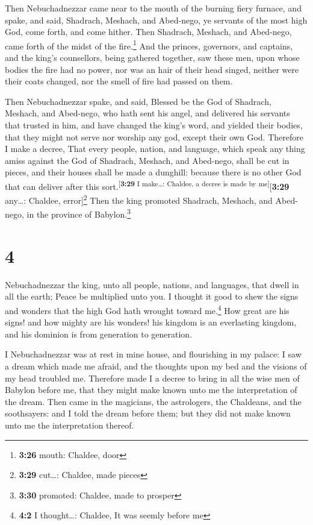  Then Nebuchadnezzar came near to the mouth of the
burning fiery furnace, and spake, and said, Shadrach, Meshach, and
Abed-nego, ye servants of the most high God, come forth, and come
hither. Then Shadrach, Meshach, and Abed-nego, came forth of the midst
of the fire.\footnote{\textbf{3:26} mouth: Chaldee, door}
 And the princes, governors, and captains, and the king's
counsellors, being gathered together, saw these men, upon whose bodies
the fire had no power, nor was an hair of their head singed, neither
were their coats changed, nor the smell of fire had passed on them.

 Then Nebuchadnezzar spake, and said, Blessed be the God
of Shadrach, Meshach, and Abed-nego, who hath sent his angel, and
delivered his servants that trusted in him, and have changed the king's
word, and yielded their bodies, that they might not serve nor worship
any god, except their own God.  Therefore I make a
decree, That every people, nation, and language, which speak any thing
amiss against the God of Shadrach, Meshach, and Abed-nego, shall be cut
in pieces, and their houses shall be made a dunghill: because there is
no other God that can deliver after this
sort.\textsuperscript{{[}\textbf{3:29} I make\ldots: Chaldee, a decree
is made by me{]}}{[}\textbf{3:29} any\ldots: Chaldee,
error{]}\footnote{\textbf{3:29} cut\ldots: Chaldee, made pieces}
 Then the king promoted Shadrach, Meshach, and Abed-nego,
in the province of Babylon.\footnote{\textbf{3:30} promoted: Chaldee,
  made to prosper}

\hypertarget{section-3}{%
\section{4}\label{section-3}}

 Nebuchadnezzar the king, unto all people, nations, and
languages, that dwell in all the earth; Peace be multiplied unto you.
 I thought it good to shew the signs and wonders that the
high God hath wrought toward me.\footnote{\textbf{4:2} I thought\ldots:
  Chaldee, It was seemly before me}  How great are his
signs! and how mighty are his wonders! his kingdom is an everlasting
kingdom, and his dominion is from generation to generation.

 I Nebuchadnezzar was at rest in mine house, and
flourishing in my palace:  I saw a dream which made me
afraid, and the thoughts upon my bed and the visions of my head troubled
me.  Therefore made I a decree to bring in all the wise
men of Babylon before me, that they might make known unto me the
interpretation of the dream.  Then came in the magicians,
the astrologers, the Chaldeans, and the soothsayers: and I told the
dream before them; but they did not make known unto me the
interpretation thereof.

